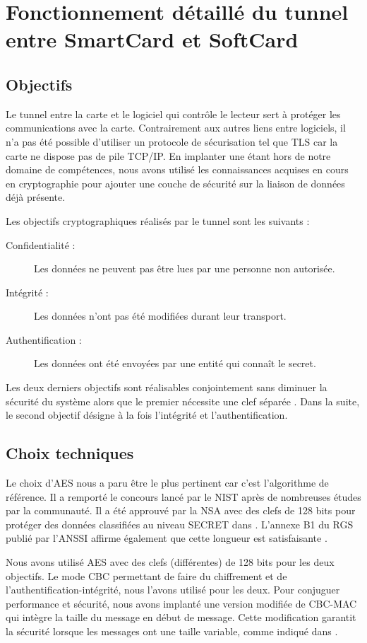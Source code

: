 \documentclass[a4paper,11pt,french]{article}
\begin{document}
\section{Fonctionnement détaillé du tunnel entre SmartCard et SoftCard}
\label{TunnelSS}


\subsection{Objectifs}
Le tunnel entre la carte et le logiciel qui contr\^ole le lecteur sert à 
protéger les communications avec la carte. Contrairement aux autres liens entre 
logiciels, il n'a pas été possible d'utiliser un protocole de sécurisation tel 
que TLS car la carte ne dispose pas de pile TCP/IP. En implanter une étant hors
de notre domaine de compétences, nous avons utilisé les connaissances acquises 
en cours en cryptographie pour ajouter une couche de sécurité sur la liaison de 
données déjà présente. 

Les objectifs cryptographiques réalisés par le tunnel sont les suivants : 
\begin{description}
    \item[Confidentialité :] Les données ne peuvent pas être lues par une 
        personne non autorisée.
    \item[Intégrité :] Les données n'ont pas été modifiées durant leur 
        transport.
    \item[Authentification :] Les données ont été envoyées par une entité qui 
        connaît le secret.
\end{description}
Les deux derniers objectifs sont réalisables conjointement sans diminuer la 
sécurité du système alors que le premier nécessite une clef séparée \cite[section
2.5.1]{RGS ANSSI}. Dans la suite, le second objectif désigne à la fois 
l'intégrité et l'authentification. 


\subsection{Choix techniques}
Le choix d'AES nous a paru être le plus pertinent car c'est l'algorithme de 
référence. Il a remporté le concours lancé par le NIST après de nombreuses 
études par la communauté. Il a été approuvé par la NSA avec des clefs de 128
bits pour protéger des données classifiées au niveau SECRET dans \cite{NSA}. 
L'annexe B1 du RGS publié par l'ANSSI affirme également que cette longueur est
satisfaisante \cite{RGS ANSSI}. 


Nous avons utilisé AES avec des clefs (différentes) de 128 bits pour les deux 
objectifs. Le mode CBC permettant de faire du chiffrement et de 
l'authentification-intégrité, nous l'avons utilisé pour les deux. Pour conjuguer
performance et sécurité, nous avons implanté une version modifiée de CBC-MAC qui
intègre la taille du message en début de message. Cette modification garantit la
sécurité lorsque les messages ont une taille variable, comme indiqué dans 
\cite{CBC-MAC}.
\end{document}

